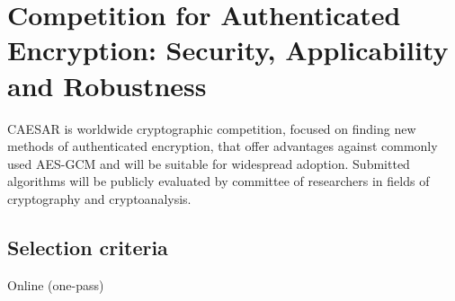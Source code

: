 \section{Competition for Authenticated Encryption: Security, Applicability and Robustness}

CAESAR is worldwide cryptographic competition, focused on finding new methods of authenticated encryption, that offer advantages against commonly used AES-GCM and will be suitable for widespread adoption. Submitted algorithms will be publicly evaluated by committee of researchers in fields of cryptography and cryptoanalysis.



\subsection{Selection criteria}

\begin{description}
  \item[Online (one-pass)]
\end{description}





